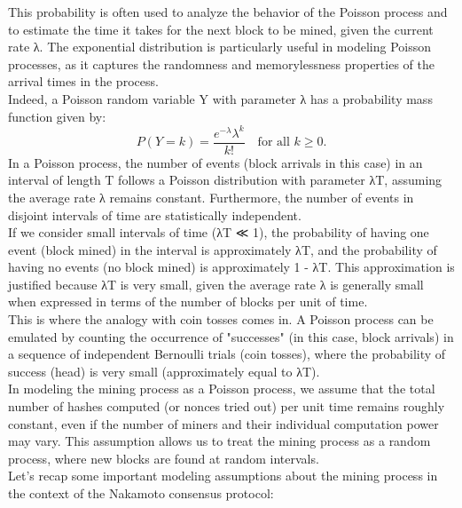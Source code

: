This probability is often used to analyze the behavior of the Poisson process and to estimate the time it takes for the next block to be mined, given the current rate λ. The exponential distribution is particularly useful in modeling Poisson processes, as it captures the randomness and memorylessness properties of the arrival times in the process.\\
Indeed, a Poisson random variable Y with parameter λ has a probability mass function given by:
$$P(Y = k) = \frac{e^{-\lambda} \lambda^k}{k!} \quad \text{for all } k \geq 0.$$
In a Poisson process, the number of events (block arrivals in this case) in an interval of length T follows a Poisson distribution with parameter λT, assuming the average rate λ remains constant. Furthermore, the number of events in disjoint intervals of time are statistically independent.\\
If we consider small intervals of time (λT ≪ 1), the probability of having one event (block mined) in the interval is approximately λT, and the probability of having no events (no block mined) is approximately 1 - λT. This approximation is justified because λT is very small, given the average rate λ is generally small when expressed in terms of the number of blocks per unit of time.\\
This is where the analogy with coin tosses comes in. A Poisson process can be emulated by counting the occurrence of "successes" (in this case, block arrivals) in a sequence of independent Bernoulli trials (coin tosses), where the probability of success (head) is very small (approximately equal to λT).\\
In modeling the mining process as a Poisson process, we assume that the total number of hashes computed (or nonces tried out) per unit time remains roughly constant, even if the number of miners and their individual computation power may vary. This assumption allows us to treat the mining process as a random process, where new blocks are found at random intervals.\\
Let's recap some important modeling assumptions about the mining process in the context of the Nakamoto consensus protocol:\\
